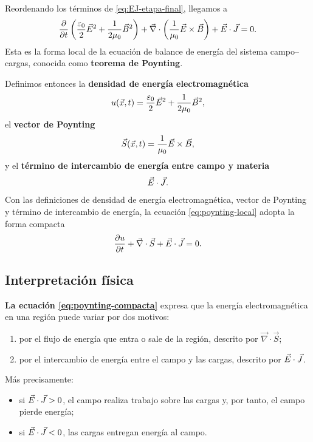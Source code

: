 \documentclass[../main.tex]{subfiles}
\begin{document}
Reordenando los términos de \eqref{eq:EJ-etapa-final}, llegamos a
\begin{equation}
    \frac{\partial}{\partial t}
    \left(
        \frac{\varepsilon_0}{2}\vec{E}^2+\frac{1}{2\mu_0}\vec{B}^2
    \right)
    +
    \vec\nabla\cdot\left(\frac{1}{\mu_0}\vec{E}\times\vec{B}\right)
    +
    \vec{E}\cdot\vec{J}
    =0.
    \label{eq:poynting-local}
\end{equation}
Esta es la forma local de la ecuación de balance de energía del sistema campo--cargas, conocida como \textbf{teorema de Poynting}.

Definimos entonces la \textbf{densidad de energía electromagnética}
\begin{equation*}
    u(\vec x,t)=\frac{\varepsilon_0}{2}\vec{E}^2+\frac{1}{2\mu_0}\vec{B}^2,
\end{equation*}
el \textbf{vector de Poynting}
\begin{equation*}
    \vec S(\vec x,t)=\frac{1}{\mu_0}\vec{E}\times\vec{B},
\end{equation*}
y el \textbf{término de intercambio de energía entre campo y materia}
\begin{equation*}
    \vec{E}\cdot\vec{J}.
\end{equation*}
Con las definiciones de densidad de energía electromagnética, vector de Poynting y término de intercambio de energía, la ecuación \eqref{eq:poynting-local} adopta la forma compacta
\begin{equation}
    \frac{\partial u}{\partial t}+\vec\nabla\cdot\vec S+\vec{E}\cdot\vec{J}=0.
    \label{eq:poynting-compacta}
\end{equation}

\subsection*{Interpretación física}

\textbf{La ecuación \eqref{eq:poynting-compacta}} expresa que la energía electromagnética en una región puede variar por dos motivos:

\begin{enumerate}
    \item por el flujo de energía que entra o sale de la región, descrito por $\vec\nabla\cdot\vec S$;
    \item por el intercambio de energía entre el campo y las cargas, descrito por $\vec{E}\cdot\vec{J}$.
\end{enumerate}

Más precisamente:

\begin{itemize}
    \item si $\vec{E}\cdot\vec{J}>0$, el campo realiza trabajo sobre las cargas y, por tanto, el campo pierde energía;
    \item si $\vec{E}\cdot\vec{J}<0$, las cargas entregan energía al campo.
\end{itemize}
\end{document}
